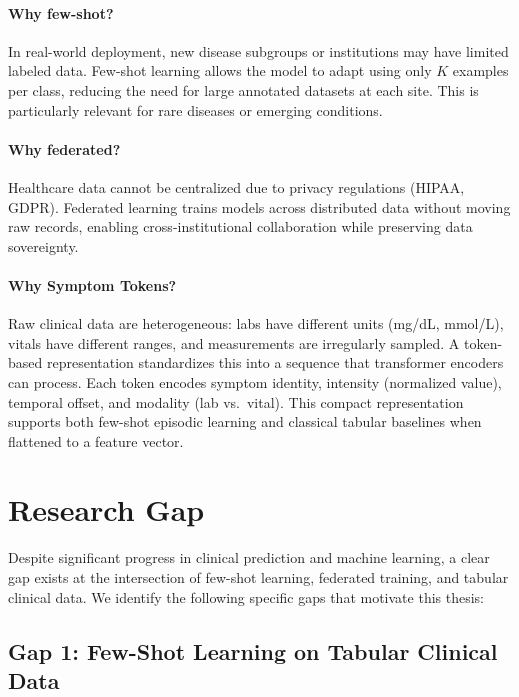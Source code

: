 \paragraph{Why few-shot?} In real-world deployment, new disease subgroups or institutions may have limited labeled data. Few-shot learning allows the model to adapt using only $K$ examples per class, reducing the need for large annotated datasets at each site. This is particularly relevant for rare diseases or emerging conditions.

\paragraph{Why federated?} Healthcare data cannot be centralized due to privacy regulations (HIPAA, GDPR). Federated learning trains models across distributed data without moving raw records, enabling cross-institutional collaboration while preserving data sovereignty.

\paragraph{Why Symptom Tokens?} Raw clinical data are heterogeneous: labs have different units (mg/dL, mmol/L), vitals have different ranges, and measurements are irregularly sampled. A token-based representation standardizes this into a sequence that transformer encoders can process. Each token encodes symptom identity, intensity (normalized value), temporal offset, and modality (lab vs.\ vital). This compact representation supports both few-shot episodic learning and classical tabular baselines when flattened to a feature vector.

\section{Research Gap}

Despite significant progress in clinical prediction and machine learning, a clear gap exists at the intersection of few-shot learning, federated training, and tabular clinical data. We identify the following specific gaps that motivate this thesis:

\subsection{Gap 1: Few-Shot Learning on Tabular Clinical Data}

